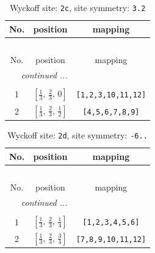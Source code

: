 \documentclass[fleqn,8pt]{jsarticle}
\begin{document}
\renewcommand{\arraystretch}{1.2}
\begin{longtable}{ccc}
\caption{Wyckoff site: {\tt 2c}, site symmetry: {\tt 3.2}}
 \\
 \hline \hline
No. & position & mapping \\ \hline \endfirsthead

\multicolumn{2}{l}{\tablename\ \thetable{}} \\
 \hline \hline
No. & position & mapping \\ \hline \endhead

 \hline \hline
\multicolumn{2}{r}{\footnotesize\it continued ...} \\ \endfoot

 \hline \hline
\multicolumn{2}{r}{} \\ \endlastfoot

1 & $\left[ \frac{1}{3},\, \frac{2}{3},\, 0 \right]$ & {\tt [1,2,3,10,11,12]} \\ \hline
2 & $\left[ \frac{1}{3},\, \frac{2}{3},\, \frac{1}{2} \right]$ & {\tt [4,5,6,7,8,9]} \\
\end{longtable}
\renewcommand{\arraystretch}{1.2}
\begin{longtable}{ccc}
\caption{Wyckoff site: {\tt 2d}, site symmetry: {\tt -6..}}
 \\
 \hline \hline
No. & position & mapping \\ \hline \endfirsthead

\multicolumn{2}{l}{\tablename\ \thetable{}} \\
 \hline \hline
No. & position & mapping \\ \hline \endhead

 \hline \hline
\multicolumn{2}{r}{\footnotesize\it continued ...} \\ \endfoot

 \hline \hline
\multicolumn{2}{r}{} \\ \endlastfoot

1 & $\left[ \frac{1}{3},\, \frac{2}{3},\, \frac{1}{4} \right]$ & {\tt [1,2,3,4,5,6]} \\ \hline
2 & $\left[ \frac{1}{3},\, \frac{2}{3},\, \frac{3}{4} \right]$ & {\tt [7,8,9,10,11,12]} \\
\end{longtable}
\renewcommand{\arraystretch}{1.2}
\end{document}
